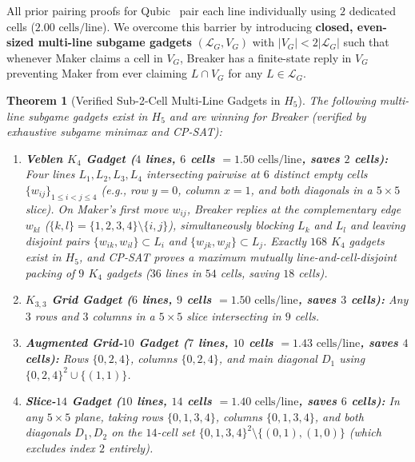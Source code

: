 \documentclass[11pt,a4paper]{article}
\newtheorem{theorem}{Theorem}[section]
\theoremstyle{definition}
\theoremstyle{remark}
\begin{document}
All prior pairing proofs for Qubic~\cite{HalesJewett1963,GolombHales2002,Cain2025} pair each line individually using $2$ dedicated cells ($2.00\text{ cells/line}$). We overcome this barrier by introducing \textbf{closed, even-sized multi-line subgame gadgets} $( \mathcal{L}_G, V_G )$ with $|V_G| < 2|\mathcal{L}_G|$ such that whenever Maker claims a cell in $V_G$, Breaker has a finite-state reply in $V_G$ preventing Maker from ever claiming $L \cap V_G$ for any $L \in \mathcal{L}_G$.

\begin{theorem}[Verified Sub-2-Cell Multi-Line Gadgets in $H_5$]
\label{thm:gadgets}
The following multi-line subgame gadgets exist in $H_5$ and are winning for Breaker (verified by exhaustive subgame minimax and CP-SAT):
\begin{enumerate}[noitemsep]
    \item \textbf{Veblen $K_4$ Gadget ($4$ lines, $6$ cells $= 1.50\text{ cells/line}$, saves $2$ cells):} Four lines $L_1, L_2, L_3, L_4$ intersecting pairwise at $6$ distinct empty cells $\{w_{ij}\}_{1 \le i < j \le 4}$ (e.g., row $y=0$, column $x=1$, and both diagonals in a $5 \times 5$ slice). On Maker's first move $w_{ij}$, Breaker replies at the complementary edge $w_{kl}$ ($\{k,l\} = \{1,2,3,4\} \setminus \{i,j\}$), simultaneously blocking $L_k$ and $L_l$ and leaving disjoint pairs $\{w_{ik}, w_{il}\} \subset L_i$ and $\{w_{jk}, w_{jl}\} \subset L_j$. Exactly $168$ $K_4$ gadgets exist in $H_5$, and CP-SAT proves a maximum mutually line-and-cell-disjoint packing of $9$ $K_4$ gadgets ($36$ lines in $54$ cells, saving $18$ cells).
    \item \textbf{$K_{3,3}$ Grid Gadget ($6$ lines, $9$ cells $= 1.50\text{ cells/line}$, saves $3$ cells):} Any $3$ rows and $3$ columns in a $5 \times 5$ slice intersecting in $9$ cells.
    \item \textbf{Augmented Grid-$10$ Gadget ($7$ lines, $10$ cells $= 1.43\text{ cells/line}$, saves $4$ cells):} Rows $\{0,2,4\}$, columns $\{0,2,4\}$, and main diagonal $D_1$ using $\{0,2,4\}^2 \cup \{(1,1)\}$.
    \item \textbf{Slice-$14$ Gadget ($10$ lines, $14$ cells $= 1.40\text{ cells/line}$, saves $6$ cells):} In any $5 \times 5$ plane, taking rows $\{0,1,3,4\}$, columns $\{0,1,3,4\}$, and both diagonals $D_1, D_2$ on the $14$-cell set $\{0,1,3,4\}^2 \setminus \{(0,1),(1,0)\}$ (which excludes index $2$ entirely).
\end{enumerate}
\end{theorem}
\end{document}
